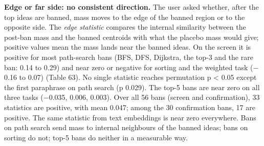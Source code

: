 \documentclass[11pt,letterpaper]{article}
\begin{document}
\endgroup
\textbf{Edge or far side: no consistent direction.} The user asked whether, after the top ideas are banned, mass moves to the edge of the banned region or to the opposite side. The \emph{edge statistic} compares the internal similarity between the post-ban mass and the banned centroids with what the placebo mass would give; positive values mean the mass lands near the banned ideas. On the screen it is positive for most path-search bans (BFS, DFS, Dijkstra, the top-3 and the rare ban: 0.14 to 0.29) and near zero or negative for sorting and the weighted task (\ensuremath{-}0.16 to 0.07) (Table 63). No single statistic reaches permutation p \textless{} 0.05 except the first paraphrase on path search (p 0.029). The top-5 bans are near zero on all three tasks (\ensuremath{-}0.035, 0.006, 0.003). Over all 56 bans (screen and confirmation), 33 statistics are positive, with mean 0.047; among the 30 confirmation bans, 17 are positive. The same statistic from text embeddings is near zero everywhere. Bans on path search send mass to internal neighbours of the banned ideas; bans on sorting do not; top-5 bans do neither in a measurable way.
\end{document}
